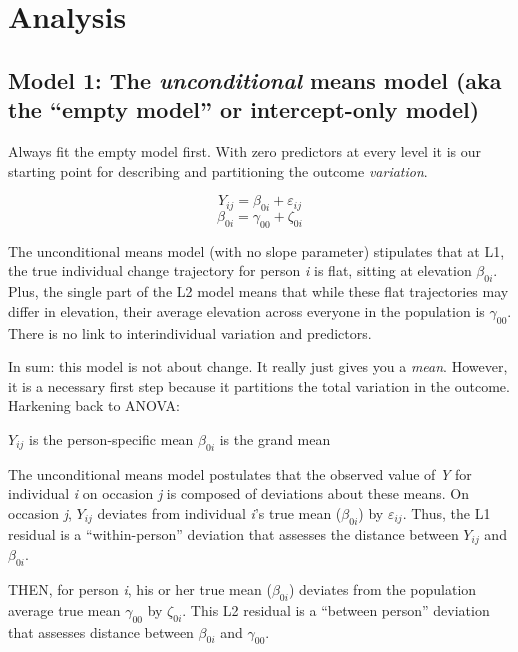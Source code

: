 \documentclass[
  11pt,
]{book}
\begin{document}
\hypertarget{analysis}{%
\section{Analysis}\label{analysis}}

\hypertarget{model-1-the-unconditional-means-model-aka-the-empty-model-or-intercept-only-model}{%
\subsection{\texorpdfstring{Model 1: The \emph{unconditional} means model (aka the ``empty model'' or intercept-only model)}{Model 1: The unconditional means model (aka the ``empty model'' or intercept-only model)}}\label{model-1-the-unconditional-means-model-aka-the-empty-model-or-intercept-only-model}}

Always fit the empty model first. With zero predictors at every level it is our starting point for describing and partitioning the outcome \emph{variation}.

\[Y_{ij}=\beta _{0i}+\varepsilon _{ij}\]
\[\beta _{0i}=\gamma _{00}+\zeta _{0i}\]

The unconditional means model (with no slope parameter) stipulates that at L1, the true individual change trajectory for person \emph{i} is flat, sitting at elevation \(\beta _{0i}\). Plus, the single part of the L2 model means that while these flat trajectories may differ in elevation, their average elevation across everyone in the population is \(\gamma _{00}\). There is no link to interindividual variation and predictors.

In sum: this model is not about change. It really just gives you a \emph{mean}. However, it is a necessary first step because it partitions the total variation in the outcome. Harkening back to ANOVA:

\(Y_{ij}\) is the person-specific mean
\(\beta _{0i}\) is the grand mean

The unconditional means model postulates that the observed value of \emph{Y} for individual \emph{i} on occasion \emph{j} is composed of deviations about these means. On occasion \emph{j}, \(Y_{ij}\) deviates from individual \emph{i}'s true mean (\(\beta _{0i}\)) by \(\varepsilon _{ij}\). Thus, the L1 residual is a ``within-person'' deviation that assesses the distance between \(Y_{ij}\) and\(\beta _{0i}\).

THEN, for person \emph{i}, his or her true mean (\(\beta _{0i}\)) deviates from the population average true mean \(\gamma _{00}\) by \(\zeta _{0i}\). This L2 residual is a ``between person'' deviation that assesses distance between \(\beta _{0i}\) and \(\gamma _{00}\).
\end{document}
